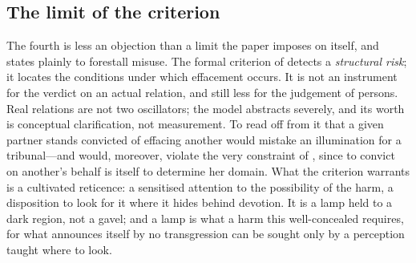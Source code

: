 \subsection{The limit of the criterion}
\label{p18:sub:obj-overclaim}
The fourth is less an objection than a limit the paper imposes on itself, and states plainly to forestall misuse. The formal criterion of  detects a \emph{structural risk}; it locates the conditions under which effacement occurs. It is not an instrument for the verdict on an actual relation, and still less for the judgement of persons. Real relations are not two oscillators; the model abstracts severely, and its worth is conceptual clarification, not measurement. To read off from it that a given partner stands convicted of effacing another would mistake an illumination for a tribunal---and would, moreover, violate the very constraint of , since to convict on another's behalf is itself to determine her domain. What the criterion warrants is a cultivated reticence: a sensitised attention to the possibility of the harm, a disposition to look for it where it hides behind devotion. It is a lamp held to a dark region, not a gavel; and a lamp is what a harm this well-concealed requires, for what announces itself by no transgression can be sought only by a perception taught where to look.

